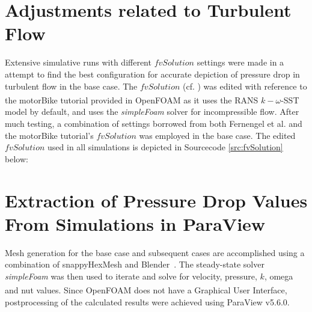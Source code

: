 \section{Adjustments related to Turbulent Flow}
Extensive simulative runs with different $fvSolution$ settings were made in a attempt to find the best configuration for accurate depiction of pressure drop in turbulent flow in the base case. The $fvSolution$ (cf. \cite{Fernengel2020}) was edited with reference to the motorBike tutorial provided in OpenFOAM\textsuperscript{\textregistered} as it uses the RANS $k-\omega$-SST model by default, and uses the \emph{simpleFoam} solver for incompressible flow. After much testing, a combination of settings borrowed from both Fernengel et al. \cite{Fernengel2020} and the motorBike tutorial's $fvSolution$ was employed in the base case. The edited $fvSolution$ used in all simulations is depicted in Sourcecode \ref{src:fvSolution} below:

\section{Extraction of Pressure Drop Values From Simulations in ParaView}
Mesh generation for the base case and subsequent cases are accomplished using a combination of snappyHexMesh and Blender\texttrademark\ . The steady-state solver \emph{simpleFoam} was then used to iterate and solve for velocity, pressure, $k$, omega and nut values. Since OpenFOAM\textsuperscript{\textregistered} does not have a Graphical User Interface, postprocessing of the calculated results were achieved using ParaView v5.6.0.

